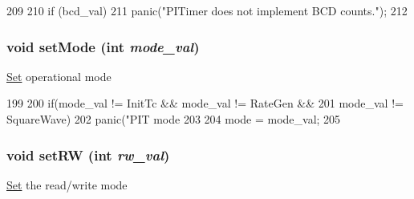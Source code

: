 \begin{DoxyCode}
209 {
210     if (bcd_val)
211         panic("PITimer does not implement BCD counts.\n");
212 }
\end{DoxyCode}
\hypertarget{classIntel8254Timer_1_1Counter_ae3afb307b529d4a7f35da891e289f45d}{
\subsubsection[{setMode}]{\setlength{\rightskip}{0pt plus 5cm}void setMode (int {\em mode\_\-val})}}
\label{classIntel8254Timer_1_1Counter_ae3afb307b529d4a7f35da891e289f45d}
\hyperlink{classSet}{Set} operational mode 


\begin{DoxyCode}
199 {
200     if(mode_val != InitTc && mode_val != RateGen &&
201        mode_val != SquareWave)
202         panic("PIT mode %
203 
204     mode = mode_val;
205 }
\end{DoxyCode}
\hypertarget{classIntel8254Timer_1_1Counter_a003bc7e494482e1a689be6151977b568}{
\subsubsection[{setRW}]{\setlength{\rightskip}{0pt plus 5cm}void setRW (int {\em rw\_\-val})}}
\label{classIntel8254Timer_1_1Counter_a003bc7e494482e1a689be6151977b568}
\hyperlink{classSet}{Set} the read/write mode 


